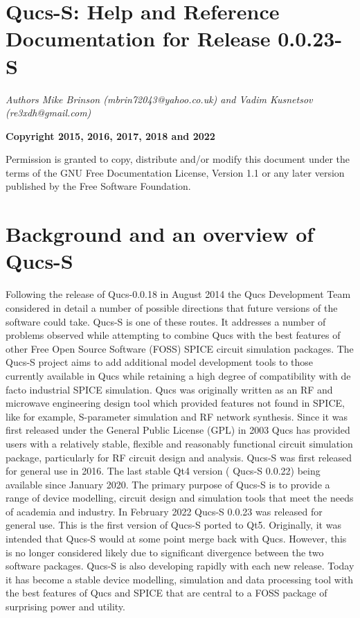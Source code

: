 

\chapter{Qucs-S: Help and Reference Documentation for Release 0.0.23-S }

\hfill\textsl{Authors Mike Brinson (mbrin72043@yahoo.co.uk) and Vadim Kusnetsov (re3xdh@gmail.com)}

\hfill \noindent  \textbf{Copyright 2015, 2016, 2017, 2018 and 2022}

\noindent Permission is granted to copy, distribute and/or modify this document under the terms of the GNU Free Documentation License,  Version  1.1  or any  later version published  by the Free Software  Foundation.

\chapter{Background and an overview of Qucs-S}
Following the release of Qucs-0.0.18 in August 2014 the Qucs Development Team considered in detail a number of possible directions that future versions of the software could take. Qucs-S is one of these routes. It addresses a number of problems observed while attempting to combine Qucs with the best features of other Free Open Source Software (FOSS) SPICE circuit simulation packages. The Qucs-S project aims to add additional model development tools to those currently available in Qucs while retaining a high degree of compatibility with de facto industrial SPICE simulation. Qucs was originally written as an RF and microwave engineering design tool which provided features not found in SPICE, like for example, S-parameter simulation and RF network synthesis.  Since it was first released under the General Public License (GPL) in 2003 Qucs has provided users with a relatively stable, flexible and reasonably functional circuit simulation package, particularly for RF circuit design and analysis. Qucs-S was first released for general use in 2016. The last stable Qt4 version ( Qucs-S 0.0.22) being available since January 2020.  The primary purpose of Qucs-S is to provide a range of device modelling, circuit design and simulation tools that meet the needs of academia and industry. In February 2022 Qucs-S 0.0.23 was released for general use.  This is the first version of Qucs-S ported to Qt5.  Originally, it was intended that Qucs-S would at some point merge back with Qucs.  However, this is no longer considered likely due to significant divergence between the two software packages.  Qucs-S is also developing rapidly with each new release.  Today it has become a stable device modelling, simulation and data processing tool with the best features of Qucs and SPICE that are central to a FOSS package of surprising power and utility.
\newline

